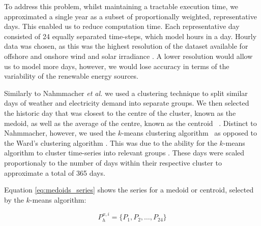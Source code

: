

To address this problem, whilst maintaining a tractable execution time, we approximated a single year as a subset of proportionally weighted, representative days. This enabled us to reduce computation time. Each representative day consisted of 24 equally separated time-steps, which model hours in a day. Hourly data was chosen, as this was the highest resolution of the dataset available for offshore and  onshore wind and solar irradiance \cite{Pfenninger2016}. A lower resolution would allow us to model more days, however, we would lose accuracy in terms of the variability of the renewable energy sources. 


Similarly to Nahmmacher \textit{et al.} we used a clustering technique to split similar days of weather and electricity demand into separate groups. We then selected the historic day that was closest to the centre of the cluster, known as the medoid, as well as the average of the centre, known as the centroid ~\cite{Nahmmacher2016}. Distinct to Nahmmacher, however, we used the $k$-means clustering algorithm~\cite{forgy65} as opposed to the Ward's clustering algorithm \cite{doi:10.1080/01621459.1963.10500845}. This was due to the ability for the $k$-means algorithm to cluster time-series into relevant groups \cite{Kell2018}. These days were scaled proportionaly to the number of days within their respective cluster to approximate a total of 365 days.

Equation \ref{eq:medoids_series} shows the series for a medoid or centroid, selected by the $k$-means algorithm:

\begin{equation}
\label{eq:medoids_series}
P^{x,i}_{h}=\{P_1, P_2, \ldots, P_{24}\}
\end{equation}

